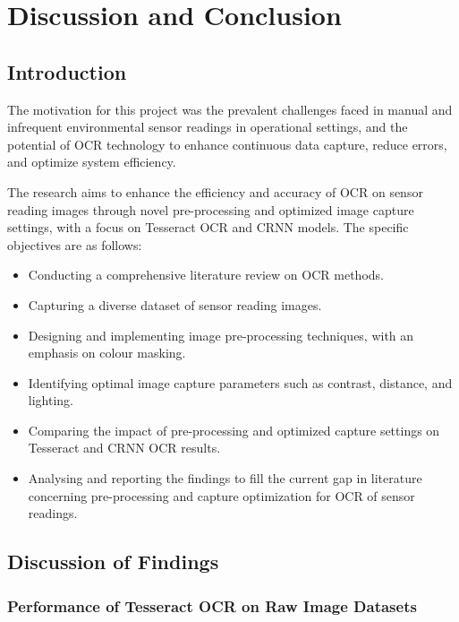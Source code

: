 \chapter{Discussion and Conclusion}
\label{chap:conclusion}

\section{Introduction}

The motivation for this project was the prevalent challenges faced in manual and infrequent environmental sensor readings in operational settings, and the potential of OCR technology to enhance continuous data capture, reduce errors, and optimize system efficiency.


The research aims to enhance the efficiency and accuracy of OCR on sensor reading images through novel pre-processing and optimized image capture settings, with a focus on Tesseract OCR and CRNN models. The specific objectives are as follows:

\begin{itemize}
    \item Conducting a comprehensive literature review on OCR methods.
    \item Capturing a diverse dataset of sensor reading images.
    \item Designing and implementing image pre-processing techniques, with an emphasis on colour masking.
    \item Identifying optimal image capture parameters such as contrast, distance, and lighting.
    \item Comparing the impact of pre-processing and optimized capture settings on Tesseract and CRNN OCR results.
    \item Analysing and reporting the findings to fill the current gap in literature concerning pre-processing and capture optimization for OCR of sensor readings.
\end{itemize}

\section{Discussion of Findings}


\subsection{Performance of Tesseract OCR on Raw Image Datasets}

